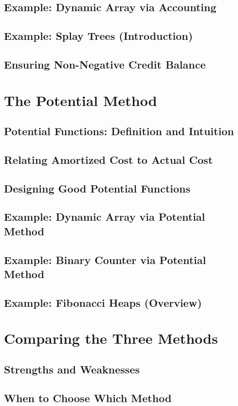 \subsection{Example: Dynamic Array via Accounting}
\subsection{Example: Splay Trees (Introduction)}
\subsection{Ensuring Non-Negative Credit Balance}

\section{The Potential Method}
\subsection{Potential Functions: Definition and Intuition}
\subsection{Relating Amortized Cost to Actual Cost}
\subsection{Designing Good Potential Functions}
\subsection{Example: Dynamic Array via Potential Method}
\subsection{Example: Binary Counter via Potential Method}
\subsection{Example: Fibonacci Heaps (Overview)}

\section{Comparing the Three Methods}
\subsection{Strengths and Weaknesses}
\subsection{When to Choose Which Method}
